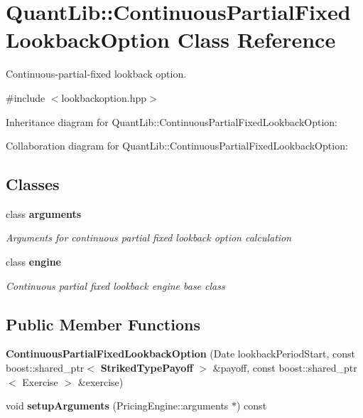 \section{Quant\+Lib\+:\+:Continuous\+Partial\+Fixed\+Lookback\+Option Class Reference}
\label{class_quant_lib_1_1_continuous_partial_fixed_lookback_option}


Continuous-\/partial-\/fixed lookback option.  




{\ttfamily \#include $<$lookbackoption.\+hpp$>$}



Inheritance diagram for Quant\+Lib\+:\+:Continuous\+Partial\+Fixed\+Lookback\+Option\+:


Collaboration diagram for Quant\+Lib\+:\+:Continuous\+Partial\+Fixed\+Lookback\+Option\+:
\subsection*{Classes}
\begin{DoxyCompactItemize}
\item 
class {\bf arguments}
\begin{DoxyCompactList}\small\item\em Arguments for continuous partial fixed lookback option calculation \end{DoxyCompactList}\item 
class {\bf engine}
\begin{DoxyCompactList}\small\item\em Continuous partial fixed lookback engine base class \end{DoxyCompactList}\end{DoxyCompactItemize}
\subsection*{Public Member Functions}
\begin{DoxyCompactItemize}
\item 
{\bfseries Continuous\+Partial\+Fixed\+Lookback\+Option} (Date lookback\+Period\+Start, const boost\+::shared\+\_\+ptr$<$ {\bf Striked\+Type\+Payoff} $>$ \&payoff, const boost\+::shared\+\_\+ptr$<$ Exercise $>$ \&exercise)\label{class_quant_lib_1_1_continuous_partial_fixed_lookback_option_aba9a0c8ab26c0ee30f37d22ac3daf17d}

\item 
void {\bfseries setup\+Arguments} (Pricing\+Engine\+::arguments $\ast$) const \label{class_quant_lib_1_1_continuous_partial_fixed_lookback_option_ab58e1b54c596e216bf1e9b593d603511}

\end{DoxyCompactItemize}
